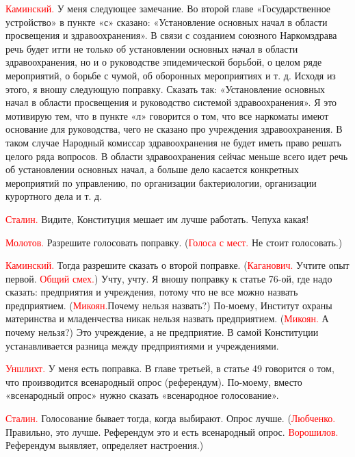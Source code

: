\documentclass{kursa4}
\begin{document}
{    \textcolor{red}{Каминский.}{
    У меня следующее замечание. Во второй главе «Государственное
    устройство» в пункте «с» сказано: «Установление основных начал в
    области просвещения и здравоохранения». В связи с созданием союзного
    Наркомздрава речь будет итти не только об установлении основных начал в
    области здравоохранения, но и о руководстве эпидемической борьбой, о
    целом ряде мероприятий, о борьбе с чумой, об оборонных мероприятиях и
    т. д. Исходя из этого, я вношу следующую поправку. Сказать так:
    «Установление основных начал в области просвещения и руководство
    системой здравоохранения». Я это мотивирую тем, что в пункте «л»
    говорится о том, что все наркоматы имеют основание для руководства,
    чего не сказано про учреждения здравоохранения. В таком случае Народный
    комиссар здравоохранения не будет иметь право решать целого ряда
    вопросов. В области здравоохранения сейчас меньше всего идет речь об
    установлении основных начал, а больше дело касается конкретных
    мероприятий по управлению, по организации бактериологии, организации
    курортного дела и т. д.}

    \textcolor{red}{Сталин.}{
    Видите, Конституция мешает им лучше работать. Чепуха какая!}

    \textcolor{red}{Молотов.}{
    Разрешите голосовать поправку.
    (}\textcolor{red}{Голоса с
    мест.}{ Не стоит голосовать.)}

    \textcolor{red}{Каминский.}{
    Тогда разрешите сказать о второй поправке.
    (}\textcolor{red}{Каганович.}{
    Учтите опыт первой.
    }\textcolor{red}{Общий
    смех.}{) Учту, учту. Я вношу поправку к статье 76-ой,
    где надо сказать: предприятия и учреждения, потому что не все можно
    назвать предприятием.
    (}\textcolor{red}{Микоян.}{Почему
    нельзя назвать?) По-моему, Институт охраны материнства и младенчества
    никак нельзя назвать предприятием.
    (}\textcolor{red}{Микоян.}{
    А почему нельзя?) Это учреждение, а не предприятие. В самой Конституции
    устанавливается разница между предприятиями и учреждениями.}

    \textcolor{red}{Уншлихт.}{
    У меня есть поправка. В главе третьей, в статье 49 говорится о том, что
    производится всенародный опрос (референдум). По-моему, вместо
    «всенародный опрос» нужно сказать «всенародное голосование».}

    \textcolor{red}{Сталин.}{
    Голосование бывает тогда, когда выбирают. Опрос лучше.
    (}\textcolor{red}{Любченко.}{
    Правильно, это лучше. Референдум это и есть всенародный
    опрос.} \textcolor{red}{Ворошилов.} Референдум выявляет, определяет
    настроения.)

}
\end{document}

